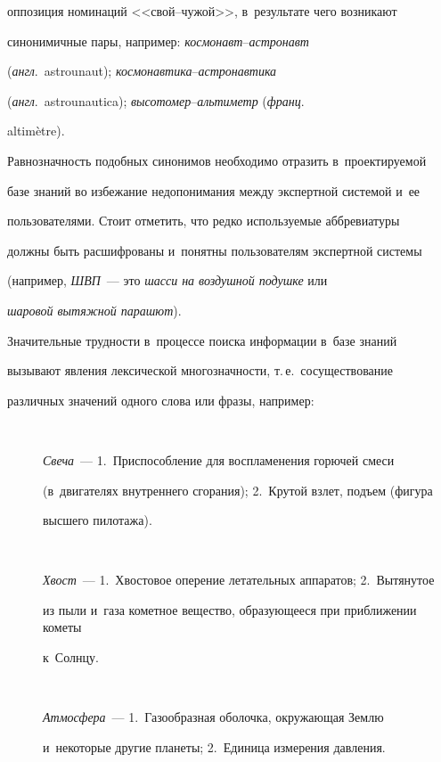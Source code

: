 оппозиция номинаций <<свой--чу\-жой>>, в~результате чего возникают 

синонимичные пары, например: \textit{кос\-мо\-навт}--\textit{аст\-ро\-навт} 

(\textit{англ}.\ astrounaut); \textit{кос\-мо\-нав\-ти\-ка}--\textit{аст\-ро\-нав\-ти\-ка} 

(\textit{англ}.\ astrounautica); \textit{вы\-со\-то\-мер}--\textit{аль\-ти\-метр} (\textit{франц}.\ 

altim\`{e}tre).

  

  Равнозначность подобных синонимов необходимо отразить в~проектируемой 

базе знаний во избежание недопонимания между экспертной сис\-те\-мой и~ее 

пользователями. Стоит отметить, что редко используемые аббревиатуры 

должны быть расшифрованы и~понятны пользователям экспертной сис\-те\-мы 

(например, \textit{ШВП}~--- это \textit{шасси на воздушной подушке} или 

\textit{шаровой вытяжной парашют}).

  

  Значительные трудности в~процессе поиска информации в~базе знаний 

вызывают явления лексической многозначности, т.\,е.\ сосуществование 

различных значений одного слова или фразы, например:\\[-16pt]



\begin{description}

\item[\,]

\textit{Свеча}~--- 1.~Приспособление для воспламенения горючей смеси 

(в~двигателях внутреннего сгорания); 2.~Крутой взлет, подъем (фигура 

высшего пилотажа).\\[-14.5pt]



\item[\,]

\textit{Хвост}~--- 1.~Хвостовое оперение летательных аппаратов; 2.~Вытянутое 

из пыли и~газа кометное вещество, образующееся при приближении кометы 

к~Солнцу.\\[-14.5pt]



\item[\,]

\textit{Атмосфера}~--- 1.~Газообразная оболочка, окружающая Землю 

и~некоторые другие планеты; 2.~Единица измерения дав\-ле\-ния.

\end{description}



